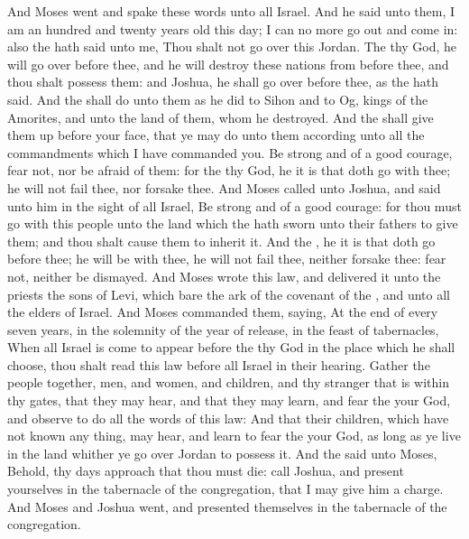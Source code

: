 \begin{biblechapter} %
 And Moses went and spake these words unto all Israel.
\verse And he said unto them, I am an hundred and twenty years old this day; I can no more go out and come in: also the \LORD hath said unto me, Thou shalt not go over this Jordan.
\verse The \LORD thy God, he will go over before thee, and he will destroy these nations from before thee, and thou shalt possess them: and Joshua, he shall go over before thee, as the \LORD hath said.
\verse And the \LORD shall do unto them as he did to Sihon and to Og, kings of the Amorites, and unto the land of them, whom he destroyed.
\verse And the \LORD shall give them up before your face, that ye may do unto them according unto all the commandments which I have commanded you.
\verse Be strong and of a good courage, fear not, nor be afraid of them: for the \LORD thy God, he it is that doth go with thee; he will not fail thee, nor forsake thee.
\verse And Moses called unto Joshua, and said unto him in the sight of all Israel, Be strong and of a good courage: for thou must go with this people unto the land which the \LORD hath sworn unto their fathers to give them; and thou shalt cause them to inherit it.
\verse And the \LORD, he it is that doth go before thee; he will be with thee, he will not fail thee, neither forsake thee: fear not, neither be dismayed.
 And Moses wrote this law, and delivered it unto the priests the sons of Levi, which bare the ark of the covenant of the \LORD, and unto all the elders of Israel.
\verse And Moses commanded them, saying, At the end of every seven years, in the solemnity of the year of release, in the feast of tabernacles,
\verse When all Israel is come to appear before the \LORD thy God in the place which he shall choose, thou shalt read this law before all Israel in their hearing.
\verse Gather the people together, men, and women, and children, and thy stranger that is within thy gates, that they may hear, and that they may learn, and fear the \LORD your God, and observe to do all the words of this law:
\verse And that their children, which have not known any thing, may hear, and learn to fear the \LORD your God, as long as ye live in the land whither ye go over Jordan to possess it.
 And the \LORD said unto Moses, Behold, thy days approach that thou must die: call Joshua, and present yourselves in the tabernacle of the congregation, that I may give him a charge. And Moses and Joshua went, and presented themselves in the tabernacle of the congregation.

\end{biblechapter}

